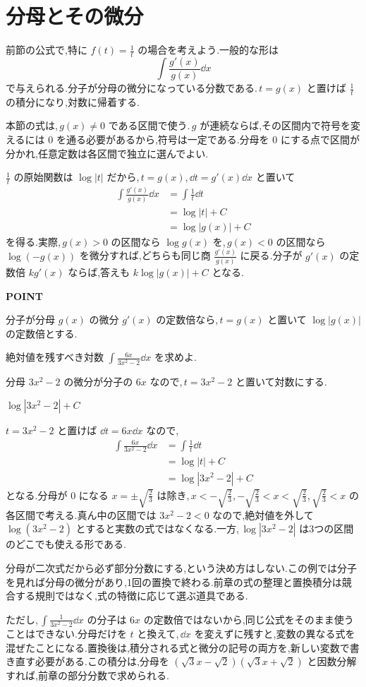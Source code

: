 \section{分母とその微分}\label{節:対数型の置換}

前節の公式で,特に $f(t)=\frac1t$ の場合を考えよう.一般的な形は
\[
 \int\frac{g'(x)}{g(x)}\dd x
\]
で与えられる.分子が分母の微分になっている分数である.\,$t=g(x)$ と置けば $\frac1t$ の積分になり,対数に帰着する.

本節の式は,\,$g(x)\ne0$ である区間で使う.\,$g$ が連続ならば,その区間内で符号を変えるには $0$ を通る必要があるから,符号は一定である.分母を $0$ にする点で区間が分かれ,任意定数は各区間で独立に選んでよい.

$\frac1t$ の原始関数は $\log|t|$ だから,\,$t=g(x)$,\,$\dd t=g'(x)\dd x$ と置いて
\begin{align*}
 \int\frac{g'(x)}{g(x)}\dd x
 &=\int\frac1t\dd t\\
 &=\log|t|+C\\
 &=\log|g(x)|+C
\end{align*}
を得る.実際,\,$g(x)>0$ の区間なら $\log g(x)$ を,\,$g(x)<0$ の区間なら $\log(-g(x))$ を微分すれば,どちらも同じ商 $\frac{g'(x)}{g(x)}$ に戻る.分子が $g'(x)$ の定数倍 $kg'(x)$ ならば,答えも $k\log|g(x)|+C$ となる.

\begin{bookpoint}
\textbf{POINT}\par
分子が分母 $g(x)$ の微分 $g'(x)$ の定数倍なら,\,$t=g(x)$ と置いて $\log|g(x)|$ の定数倍とする.
\end{bookpoint}

\begin{example}{絶対値を残すべき対数}
$\int\frac{6x}{3x^2-2}\dd x$ を求めよ.
\end{example}

分母 $3x^2-2$ の微分が分子の $6x$ なので,\,$t=3x^2-2$ と置いて対数にする.

$\log|3x^2-2|+C$

$t=3x^2-2$ と置けば $\dd t=6x\dd x$ なので,
\begin{align*}
 \int\frac{6x}{3x^2-2}\dd x
 &=\int\frac1t\dd t\\
 &=\log|t|+C\\
 &=\log|3x^2-2|+C
\end{align*}
となる.分母が $0$ になる $x=\pm\sqrt{\frac23}$ は除き,\,$x<-\sqrt{\frac23}$,\,$-\sqrt{\frac23}<x<\sqrt{\frac23}$,\,$\sqrt{\frac23}<x$ の各区間で考える.真ん中の区間では $3x^2-2<0$ なので,絶対値を外して $\log(3x^2-2)$ とすると実数の式ではなくなる.一方,\,$\log|3x^2-2|$ は3つの区間のどこでも使える形である.

分母が二次式だから必ず部分分数にする,という決め方はしない.この例では分子を見れば分母の微分があり,1回の置換で終わる.前章の式の整理と置換積分は競合する規則ではなく,式の特徴に応じて選ぶ道具である.

ただし,\,$\int\frac1{3x^2-2}\dd x$ の分子は $6x$ の定数倍ではないから,同じ公式をそのまま使うことはできない.分母だけを $t$ と換えて,\,$\dd x$ を変えずに残すと,変数の異なる式を混ぜたことになる.置換後は,積分される式と微分の記号の両方を,新しい変数で書き直す必要がある.この積分は,分母を $(\sqrt3x-\sqrt2)(\sqrt3x+\sqrt2)$ と因数分解すれば,前章の部分分数で求められる.
